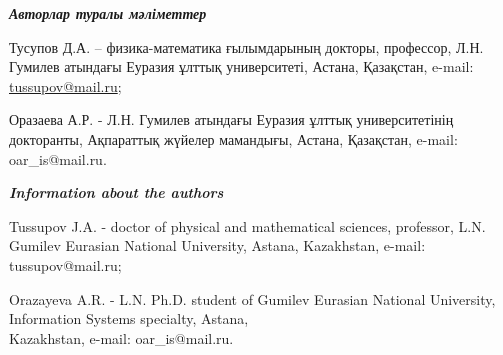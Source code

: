 \begin{authorinfo}
\hspace{1em}\emph{{\bfseries Авторлар туралы мәліметтер}}

Тусупов Д.А. -- физика-математика ғылымдарының докторы, профессор, Л.Н.
Гумилев атындағы Еуразия ұлттық университеті, Астана, Қазақстан, e-mail:
\href{mailto:oaris.83@gmail.com}{tussupov@mail.ru};

Оразаева А.Р. - Л.Н. Гумилев атындағы Еуразия ұлттық университетінің
докторанты, Ақпараттық жүйелер мамандығы, Астана, Қазақстан, e-mail:
oar\_is@mail.ru.

\hspace{1em}\emph{{\bfseries Information about the authors}}

Tussupov J.A. - doctor of physical and mathematical sciences, professor,
L.N. Gumilev Eurasian National University, Astana, Kazakhstan, e-mail:
tussupov@mail.ru;

Orazayeva A.R. - L.N. Ph.D. student of Gumilev Eurasian National
University, Information Systems specialty, Astana, \\Kazakhstan, e-mail:
oar\_is@mail.ru.
\end{authorinfo}
